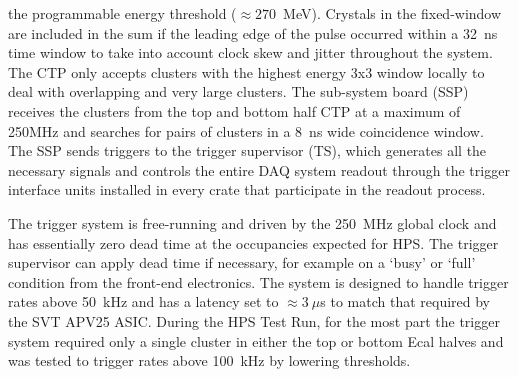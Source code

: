\documentclass[final,3p,times,twocolumn]{elsarticle}
\begin{document}
the programmable energy threshold ($\approx270$~MeV). Crystals in the 
fixed-window are included in the sum if the leading edge of the pulse occurred within a 32~ns time 
window to take into account clock skew and jitter throughout the system.
The CTP only accepts clusters with the highest energy 3x3 window locally to deal with overlapping and 
very large clusters. The sub-system board (SSP) receives the clusters from the top and bottom half CTP 
at a maximum of 250MHz and searches for pairs of clusters in a 8~ns wide coincidence window. The 
SSP sends triggers to the trigger supervisor (TS), which generates all the necessary signals and 
controls the entire DAQ system readout through the trigger interface units installed in every crate that 
participate in the readout process.

The trigger system is free-running and driven by the 250~MHz global clock and has essentially zero 
dead time at the occupancies expected for HPS. The trigger supervisor can apply dead time if 
necessary, for example on a `busy' or `full' condition from the front-end electronics. The system is 
designed to handle trigger rates above 50~kHz and has a latency set to $\approx 3~\mu$s to match 
that required by the SVT APV25 ASIC. During the HPS Test Run, for the most part the trigger system 
required only a single cluster in either the top or bottom Ecal halves and was tested to trigger rates 
above 100~kHz by lowering thresholds. 
\end{document}
